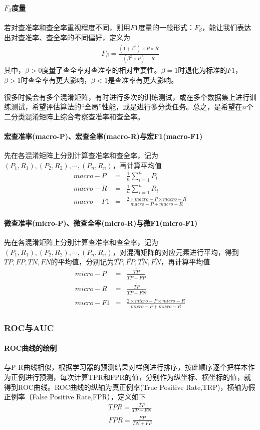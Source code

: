 \paragraph{$F_\beta$度量}若对查准率和查全率重视程度不同，则用$F1$度量的一般形式：$F_\beta$，能让我们表达出对查准率、查全率的不同偏好，定义为
\begin{eqnarray}
F_\beta=\frac{(1+\beta^2)\times P\times R}{(\beta^2\times P)+R}
\end{eqnarray}
其中，$\beta>0$度量了查全率对查准率的相对重要性。$\beta=1$时退化为标准的$F1$，$\beta>1$时查全率有更大影响，$\beta<1$是查准率有更大影响。

很多时候会有多个混淆矩阵，有时进行多次的训练测试，或在多个数据集上进行训练测试，希望评估算法的“全局”性能，或是进行多分类任务。总之，是希望在$n$个二分类混淆矩阵上综合考察查准率和查全率。
\paragraph{宏查准率(macro-P)、宏查全率(macro-R)与宏F1(macro-F1)}先在各混淆矩阵上分别计算查准率和查全率，记为$(P_1,R_1),(P_2,R_2),\cdots,(P_n,R_n)$，再计算平均值
\begin{eqnarray}
macro-P&=&\frac{1}{n}\sum_{i=1}^nP_i\\
macro-R&=&\frac{1}{n}\sum_{i=1}^nR_i\\
macro-F1&=&\frac{2\times macro-P\times macro-R}{macro-P+macro-R}
\end{eqnarray}
\paragraph{微查准率(micro-P)、微查全率(micro-R)与微F1(micro-F1)}先在各混淆矩阵上分别计算查准率和查全率，记为$(P_1,R_1),(P_2,R_2),\cdots,(P_n,R_n)$，对混淆矩阵的对应元素进行平均，得到$TP,FP,TN,FN$的平均值，分别记为$\bar{TP},\bar{FP},\bar{TN},\bar{FN}$，再计算平均值
\begin{eqnarray}
micro-P&=&\frac{\bar{TP}}{\bar{TP}+\bar{FP}}\\
micro-R&=&\frac{\bar{TP}}{\bar{TP}+\bar{FN}}\\
micro-F1&=&\frac{2\times micro-P\times micro-R}{micro-P+micro-R}
\end{eqnarray}

\subsubsection{ROC与AUC}
\paragraph{ROC曲线的绘制}与P-R曲线相似，根据学习器的预测结果对样例进行排序，按此顺序逐个把样本作为正例进行预测，每次计算TPR和FPR的值，分别作为纵坐标、横坐标的值，就得到ROC曲线。ROC曲线的纵轴为真正例率(True Positive Rate,TRP)，横轴为假正例率（False Positive Rate,FPR），定义如下
\begin{eqnarray}
TPR=\frac{TP}{TP+FN}\\
FPR=\frac{FP}{TN+FP}
\end{eqnarray}
